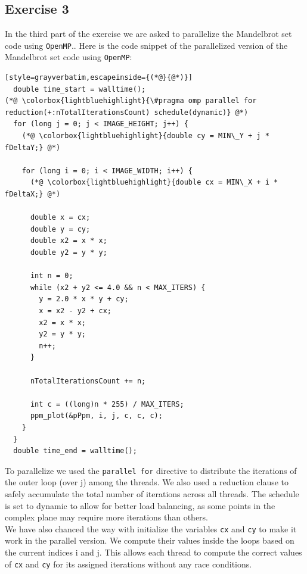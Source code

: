 \documentclass[unicode,10pt,a4paper,oneside,numbers=endperiod,openany]{scrartcl}
\begin{document}
\subsection{Exercise 3}
In the third part of the exercise we are asked to parallelize the Mandelbrot set code using \texttt{OpenMP}.. Here is the code snippet of the parallelized version of the Mandelbrot set code using \texttt{OpenMP}:
\begin{lstlisting}[style=grayverbatim,escapeinside={(*@}{@*)}]
  double time_start = walltime();
(*@ \colorbox{lightbluehighlight}{\#pragma omp parallel for reduction(+:nTotalIterationsCount) schedule(dynamic)} @*)
  for (long j = 0; j < IMAGE_HEIGHT; j++) {
    (*@ \colorbox{lightbluehighlight}{double cy = MIN\_Y + j * fDeltaY;} @*)

    for (long i = 0; i < IMAGE_WIDTH; i++) {
      (*@ \colorbox{lightbluehighlight}{double cx = MIN\_X + i * fDeltaX;} @*)

      double x = cx;
      double y = cy;
      double x2 = x * x;
      double y2 = y * y;

      int n = 0;
      while (x2 + y2 <= 4.0 && n < MAX_ITERS) {
        y = 2.0 * x * y + cy;
        x = x2 - y2 + cx;
        x2 = x * x;
        y2 = y * y;
        n++;
      }

      nTotalIterationsCount += n;

      int c = ((long)n * 255) / MAX_ITERS;
      ppm_plot(&pPpm, i, j, c, c, c);
    }
  }
  double time_end = walltime();
  \end{lstlisting}

To parallelize we used the \texttt{parallel for} directive to distribute the iterations of the outer loop (over j) among the threads. We also used a reduction clause to safely accumulate the total number of iterations across all threads. The schedule is set to dynamic to allow for better load balancing, as some points in the complex plane may require more iterations than others.\\
We have also chanced the way with initialize the variables \texttt{cx} and \texttt{cy} to make it work in the parallel version. We compute their values inside the loops based on the current indices i and j. This allows each thread to compute the correct values of \texttt{cx} and \texttt{cy} for its assigned iterations without any race conditions.\\
\end{document}

